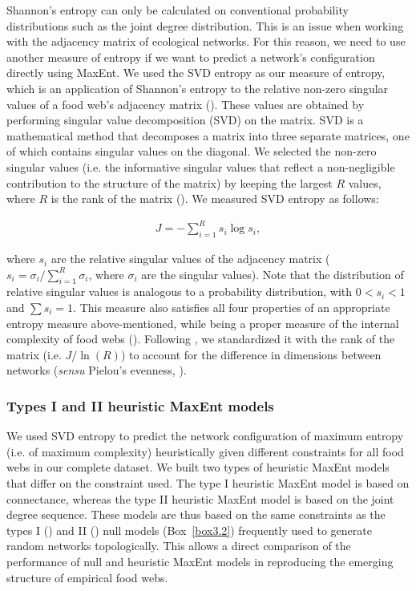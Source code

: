 Shannon's entropy can only be calculated on conventional probability
distributions such as the joint degree distribution. This is an issue when
working with the adjacency matrix of ecological networks. For this reason, we
need to use another measure of entropy if we want to predict a network's
configuration directly using MaxEnt. We used the SVD entropy as our measure of
entropy, which is an application of Shannon's entropy to the relative non-zero
singular values of a food web's adjacency matrix (\cite{Strydom2021Svd}).
These values are obtained by performing singular value decomposition (SVD) on
the matrix. SVD is a mathematical method that decomposes a matrix into three
separate matrices, one of which contains singular values on the diagonal. We
selected the non-zero singular values (i.e. the informative singular values that
reflect a non-negligible contribution to the structure of the matrix) by keeping
the largest $R$ values, where $R$ is the rank of the matrix
(\cite{Golub1987Generalization}). We measured SVD entropy as follows: 

\begin{eqnarray}
\label{eq:svd-entropy}
       J = -\sum_{i=1}^R s_i \log s_i,
\end{eqnarray}

where $s_i$ are the relative singular values of the adjacency matrix ($s_i =
\sigma_i / \sum_{i = 1}^R \sigma_i$, where $\sigma_i$ are the singular values).
Note that the distribution of relative singular values is analogous to a
probability distribution, with $0 < s_i < 1$ and $\sum s_i = 1$. This measure
also satisfies all four properties of an appropriate entropy measure
above-mentioned, while being a proper measure of the internal complexity of food
webs (\cite{Strydom2021Svd}). Following \textcite{Strydom2021Svd}, we
standardized it with the rank of the matrix (i.e. $J / \ln(R)$) to account for
the difference in dimensions between networks (\textit{sensu} Pielou's evenness,
\cite{Pielou1975Ecological}).

\subsubsection{Types I and II heuristic MaxEnt models}

We used SVD entropy to predict the network configuration of maximum entropy
(i.e. of maximum complexity) heuristically given different constraints for all
food webs in our complete dataset. We built two types of heuristic MaxEnt models
that differ on the constraint used. The type I heuristic MaxEnt model is based
on connectance, whereas the type II heuristic MaxEnt model is based on the joint
degree sequence. These models are thus based on the same constraints as the
types I (\cite{Fortuna2006Habitat}) and II (\cite{Bascompte2003Nested}) null
models (Box~\ref{box3.2}) frequently used to generate random networks
topologically. This allows a direct comparison of the performance of null and
heuristic MaxEnt models in reproducing the emerging structure of empirical food
webs. 

